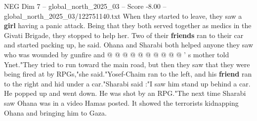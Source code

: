 \begin{textsample}{NEG Dim 7 – global\_north\_2025\_03 – Score -8.00 – global\_north\_2025\_03/122751140.txt}
When they started to leave, they saw a \textbf{girl} having a panic attack.
Being that they both served together as medics in the Givati Brigade, they stopped to help her.
Two of their \textbf{friends} ran to their car and started packing up, he said.
Ohana and Sharabi both helped anyone they saw who was wounded by gunfire and @ @ @ @ @ @ @ @ @ @ ' s mother told Ynet."They tried to run toward the main road, but then they saw that they were being fired at by RPGs,"she said."Yosef-Chaim ran to the left, and his \textbf{friend} ran to the right and hid under a car."Sharabi said :"I saw him stand up behind a car.
He popped up and went down.
He was shot by an RPG."The next time Sharabi saw Ohana was in a video Hamas posted.
It showed the terrorists kidnapping Ohana and bringing him to Gaza.

\end{textsample}
